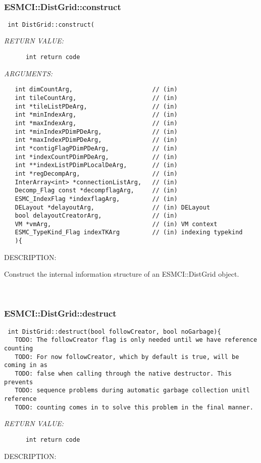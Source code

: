 \mbox{}\hrulefill\
 
\subsubsection [ESMCI::DistGrid::construct] {ESMCI::DistGrid::construct}


  
\begin{verbatim} int DistGrid::construct(\end{verbatim}{\em RETURN VALUE:}
\begin{verbatim}      int return code\end{verbatim}{\em ARGUMENTS:}
\begin{verbatim}   int dimCountArg,                      // (in)
   int tileCountArg,                     // (in)
   int *tileListPDeArg,                  // (in)
   int *minIndexArg,                     // (in)
   int *maxIndexArg,                     // (in)
   int *minIndexPDimPDeArg,              // (in)
   int *maxIndexPDimPDeArg,              // (in)
   int *contigFlagPDimPDeArg,            // (in)
   int *indexCountPDimPDeArg,            // (in)
   int **indexListPDimPLocalDeArg,       // (in)
   int *regDecompArg,                    // (in)
   InterArray<int> *connectionListArg,   // (in)
   Decomp_Flag const *decompflagArg,     // (in)
   ESMC_IndexFlag *indexflagArg,         // (in)
   DELayout *delayoutArg,                // (in) DELayout
   bool delayoutCreatorArg,              // (in)
   VM *vmArg,                            // (in) VM context
   ESMC_TypeKind_Flag indexTKArg         // (in) indexing typekind
   ){\end{verbatim}
{\sf DESCRIPTION:\\ }


      Construct the internal information structure of an ESMCI::DistGrid object.
   
 
\mbox{}\hrulefill\
 
\subsubsection [ESMCI::DistGrid::destruct] {ESMCI::DistGrid::destruct}


  
\begin{verbatim} int DistGrid::destruct(bool followCreator, bool noGarbage){
   TODO: The followCreator flag is only needed until we have reference counting
   TODO: For now followCreator, which by default is true, will be coming in as
   TODO: false when calling through the native destructor. This prevents
   TODO: sequence problems during automatic garbage collection unitl reference
   TODO: counting comes in to solve this problem in the final manner.\end{verbatim}{\em RETURN VALUE:}
\begin{verbatim}      int return code\end{verbatim}
{\sf DESCRIPTION:\\ }


